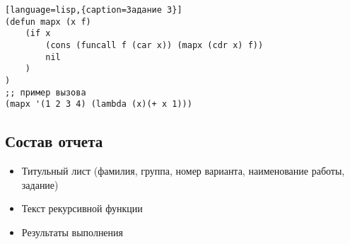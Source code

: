 \documentclass[a4paper,12pt]{article}
\begin{document}
\begin{lstlisting}[language=lisp,{caption=Задание 3}]
(defun mapx (x f) 
	(if x
		(cons (funcall f (car x)) (mapx (cdr x) f))
		nil
	)
)
;; пример вызова
(mapx '(1 2 3 4) (lambda (x)(+ x 1)))
\end{lstlisting}

\subsection{Состав отчета}
\begin{itemize}
	\item Титульный лист (фамилия, группа, номер варианта, наименование работы, задание)
	\item Текст рекурсивной функции
	\item Результаты выполнения
\end{itemize}
\end{document}
